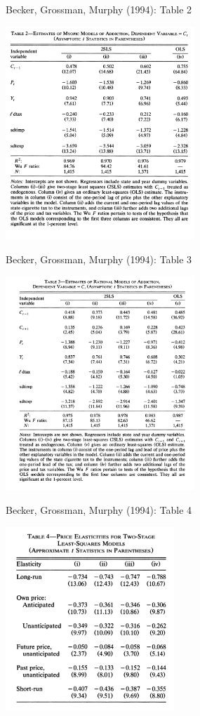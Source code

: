 \documentclass[xcolor=pdftex,dvipsnames,table,mathserif,aspectratio=169]{beamer}
\begin{document}
\begin{frame}{Becker, Grossman, Murphy (1994): Table 2}
\begin{center}
\includegraphics[width=2.8in]{./resources/gbm_t2.png}
\end{center}
\end{frame}

\begin{frame}{Becker, Grossman, Murphy (1994): Table 3}
\begin{center}
\includegraphics[width=2.8in]{./resources/gbm_t3.png}
\end{center}
\end{frame}

\begin{frame}{Becker, Grossman, Murphy (1994): Table 4}
\begin{center}
\includegraphics[width=2.5in]{./resources/gbm_t4.png}
\end{center}
\end{frame}
\end{document}

